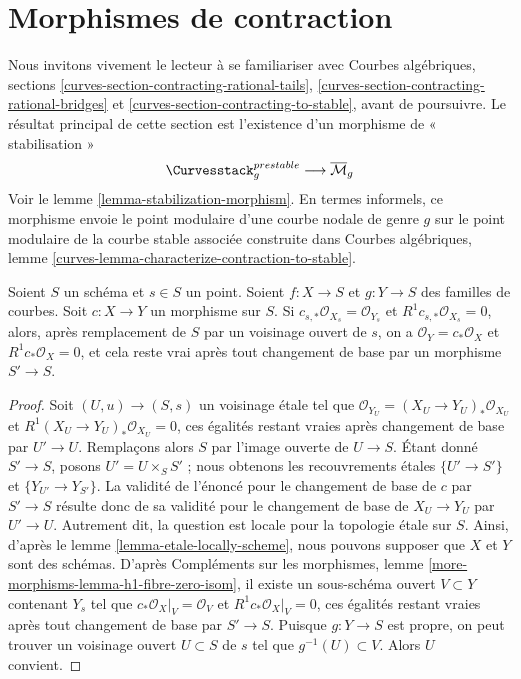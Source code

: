 \section{Morphismes de contraction}
\label{section-contracting}

\noindent
Nous invitons vivement le lecteur à se familiariser avec
Courbes algébriques, sections
\ref{curves-section-contracting-rational-tails},
\ref{curves-section-contracting-rational-bridges} et
\ref{curves-section-contracting-to-stable},
avant de poursuivre. Le résultat principal de cette section
est l'existence d'un morphisme de « stabilisation »
$$
\Curvesstack^{prestable}_g
\longrightarrow
\overline{\mathcal{M}}_g
$$
Voir le lemme \ref{lemma-stabilization-morphism}.
En termes informels, ce morphisme envoie le point modulaire d'une
courbe nodale de genre $g$ sur le point modulaire de la courbe stable
associée construite dans
Courbes algébriques, lemme \ref{curves-lemma-characterize-contraction-to-stable}.

\begin{lemma}
\label{lemma-contract}
Soient $S$ un schéma et $s \in S$ un point.
Soient $f : X \to S$ et $g : Y \to S$ des familles de courbes.
Soit $c : X \to Y$ un morphisme sur $S$. Si
$c_{s, *}\mathcal{O}_{X_s} = \mathcal{O}_{Y_s}$ et
$R^1c_{s, *}\mathcal{O}_{X_s} = 0$, alors,
après remplacement de $S$ par un voisinage ouvert de $s$,
on a $\mathcal{O}_Y = c_*\mathcal{O}_X$ et $R^1c_*\mathcal{O}_X = 0$,
et cela reste vrai après tout changement de base par un morphisme $S' \to S$.
\end{lemma}

\begin{proof}
Soit $(U, u) \to (S, s)$ un voisinage étale tel que
$\mathcal{O}_{Y_U} = (X_U \to Y_U)_*\mathcal{O}_{X_U}$ et
$R^1(X_U \to Y_U)_*\mathcal{O}_{X_U} = 0$, ces égalités restant vraies
après changement de base par $U' \to U$. Remplaçons alors $S$ par
l'image ouverte de $U \to S$. Étant donné $S' \to S$, posons $U' = U \times_S S'$ ;
nous obtenons les recouvrements étales $\{U' \to S'\}$ et
$\{Y_{U'} \to Y_{S'}\}$. La validité de l'énoncé pour
le changement de base de $c$ par $S' \to S$ résulte donc de sa validité
pour le changement de base de $X_U \to Y_U$ par
$U' \to U$. Autrement dit, la question est locale pour la
topologie étale sur $S$.
Ainsi, d'après le lemme \ref{lemma-etale-locally-scheme}, nous pouvons supposer que
$X$ et $Y$ sont des schémas. D'après
Compléments sur les morphismes, lemme \ref{more-morphisms-lemma-h1-fibre-zero-isom},
il existe un sous-schéma ouvert $V \subset Y$ contenant $Y_s$
tel que $c_*\mathcal{O}_X|_V = \mathcal{O}_V$ et
$R^1c_*\mathcal{O}_X|_V = 0$, ces égalités restant vraies après
tout changement de base par $S' \to S$. Puisque $g : Y \to S$ est propre, on peut
trouver un voisinage ouvert $U \subset S$ de $s$ tel que
$g^{-1}(U) \subset V$. Alors $U$ convient.
\end{proof}

